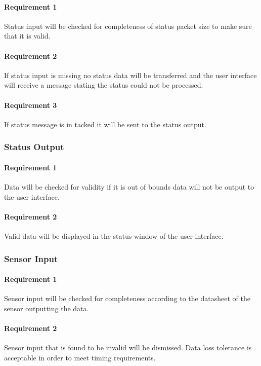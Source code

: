 \documentclass[10pt,draftclsnofoot,onecolumn,compsoc]{IEEEtran}
\begin{document}
	\paragraph{ Requirement 1}Status input will be checked for completeness of status packet size to make sure that it is valid.\par
	\paragraph{ Requirement 2}If status input is missing no status data will be transferred and the user interface will receive a message stating the status could not be processed.\par
	\paragraph{ Requirement 3} If status message is in tacked it will be sent to the status output.\par
\subsubsection{Status Output}
	\paragraph{ Requirement 1}Data will be checked for validity if it is out of bounds data will not be output to the user interface.\par
	\paragraph{ Requirement 2}Valid data will be displayed in the status window of the user interface.\par
\subsubsection{Sensor Input}
	\paragraph{ Requirement 1}Sensor input will be checked for completeness according to the datasheet of the sensor outputting the data.\par
	\paragraph{ Requirement 2} Sensor input that is found to be invalid will be dismissed. Data loss tolerance is acceptable in order to meet timing requirements.\par
\end{document}
